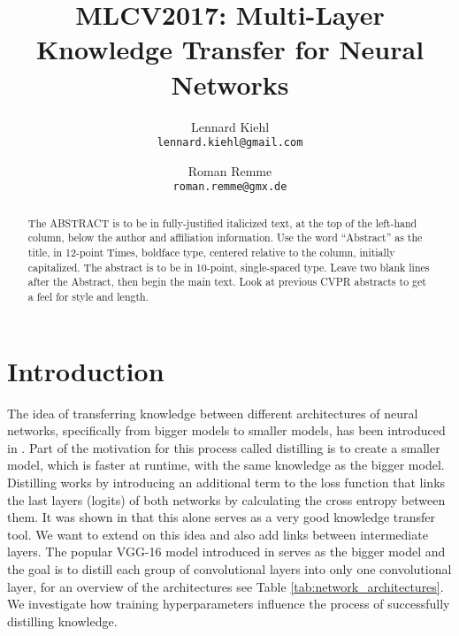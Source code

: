 \documentclass[10pt,twocolumn,letterpaper]{article}
\begin{document}
\title{MLCV2017: Multi-Layer Knowledge Transfer for Neural Networks}

\author{Lennard Kiehl\\
{\tt\small lennard.kiehl@gmail.com}
\and
Roman Remme\\
{\tt\small roman.remme@gmx.de}
}

\maketitle

\begin{abstract}
   The ABSTRACT is to be in fully-justified italicized text, at the top
   of the left-hand column, below the author and affiliation
   information. Use the word ``Abstract'' as the title, in 12-point
   Times, boldface type, centered relative to the column, initially
   capitalized. The abstract is to be in 10-point, single-spaced type.
   Leave two blank lines after the Abstract, then begin the main text.
   Look at previous CVPR abstracts to get a feel for style and length.
\end{abstract}

\section{Introduction}

The idea of transferring knowledge between different architectures of neural networks, specifically from bigger models to smaller models, has been introduced in \cite{hinton2015distilling}. Part of the motivation for this process called distilling is to create a smaller model, which is faster at runtime, with the same knowledge as the bigger model. Distilling works by introducing an additional term to the loss function that links the last layers (logits) of both networks by calculating the cross entropy between them. It was shown in \cite{hinton2015distilling} that this alone serves as a very good knowledge transfer tool. We want to extend on this idea and also add links between intermediate layers. The popular VGG-16 model introduced in \cite{DBLP:journals/corr/SimonyanZ14a} serves as the bigger model and the goal is to distill each group of convolutional layers into only one convolutional layer, for an overview of the architectures see Table \ref{tab:network_architectures}. We investigate how training hyperparameters influence the process of successfully distilling knowledge.
\end{document}
